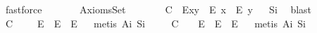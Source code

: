 \begin{isabellebody}
\ fastforce%
\endisatagproof
{\isafoldproof}%
%
\isadelimproof
%
\endisadelimproof
\ \isanewline
\ \ \isamarkupfalse%
%
\isamarkuptrue%
\ \isamarkupfalse%
\ AxiomsSet{}\isanewline
\ \ \isanewline
\ \ \ \isamarkupfalse%
\ C\ {\isacharcolon}\ {\isachardoublequoteopen}E{\isacharparenleft}x{\isasymcdot}y{\isacharparenright}\ \isactrlbold {\isasymrightarrow}\ {\isacharparenleft}E\ x\ \isactrlbold {\isasymand}\ E\ y{\isacharparenright}{\isachardoublequoteclose}%
\isadelimproof
\ %
\endisadelimproof
%
\isatagproof
{}\isamarkupfalse%
\ S\isactrlsub i\ \isamarkupfalse%
\ blast%
\endisatagproof
{\isafoldproof}%
%
\isadelimproof
%
\endisadelimproof
\ \ \isanewline
\ \ \ \isamarkupfalse%
\ C\ {\isacharcolon}\ {\isachardoublequoteopen}\isactrlbold {\isasymforall}{\isasymgamma}\ {\isasymbeta}\ {\isasymalpha}{\isachardot}\ {\isacharparenleft}E{\isacharparenleft}{\isasymgamma}{\isasymcdot}{\isasymbeta}{\isacharparenright}\ \isactrlbold {\isasymand}\ E{\isacharparenleft}{\isacharparenleft}{\isasymgamma}{\isasymcdot}{\isasymbeta}{\isacharparenright}{\isasymcdot}{\isasymalpha}{\isacharparenright}{\isacharparenright}\ \isactrlbold {\isasymrightarrow}\ E{\isacharparenleft}{\isasymbeta}{\isasymcdot}{\isasymalpha}{\isacharparenright}{\isachardoublequoteclose}%
\isadelimproof
\ %
\endisadelimproof
%
\isatagproof
{}\isamarkupfalse%
\ {\isacharparenleft}metis\ A\isactrlsub i\ S\isactrlsub i{\isacharparenright}%
\endisatagproof
{\isafoldproof}%
%
\isadelimproof
%
\endisadelimproof
\isanewline
\ \ \ \isamarkupfalse%
\ C\ {\isachardoublequoteopen}\isactrlbold {\isasymforall}{\isasymgamma}\ {\isasymbeta}\ {\isasymalpha}{\isachardot}\ {\isacharparenleft}E{\isacharparenleft}{\isasymbeta}{\isasymcdot}{\isasymalpha}{\isacharparenright}\ \isactrlbold {\isasymand}\ E{\isacharparenleft}{\isasymgamma}{\isasymcdot}{\isacharparenleft}{\isasymbeta}{\isasymcdot}{\isasymalpha}{\isacharparenright}{\isacharparenright}{\isacharparenright}\ \isactrlbold {\isasymrightarrow}\ E{\isacharparenleft}{\isasymgamma}{\isasymcdot}{\isasymbeta}{\isacharparenright}{\isachardoublequoteclose}%
\isadelimproof
\ %
\endisadelimproof
%
\isatagproof
{}\isamarkupfalse%
\ {\isacharparenleft}metis\ A\isactrlsub i\ S\isactrlsub i{\isacharparenright}%
\endisatagproof
{\isafoldproof}%
%
\isadelimproof

\end{isabellebody}
